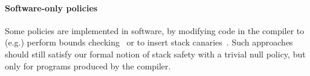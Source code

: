 \documentclass[acmsmall,review,anonymous]{acmart}\settopmatter{printfolios=true,printccs=false,printacmref=false}
\begin{document}

\paragraph*{Software-only policies}
%
Some policies are implemented in software, by modifying code in the
compiler to (e.g.) perform bounds checking~\citep{NagarakatteZMZ09} or
to insert stack canaries~\citep{Cowan+98}. Such approaches should
still satisfy our formal notion of stack safety with a trivial null
policy, but only for programs produced by the compiler.


\end{document}
